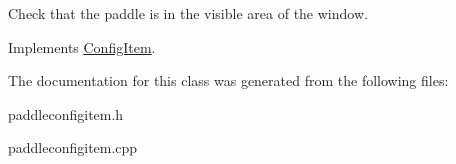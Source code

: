 Check that the paddle is in the visible area of the window. 

Implements \hyperlink{classConfigItem_a0ffeae3ab9688202ad167e15ccb3be6d}{Config\-Item}.



The documentation for this class was generated from the following files\-:\begin{DoxyCompactItemize}
\item 
paddleconfigitem.\-h\item 
paddleconfigitem.\-cpp\end{DoxyCompactItemize}
